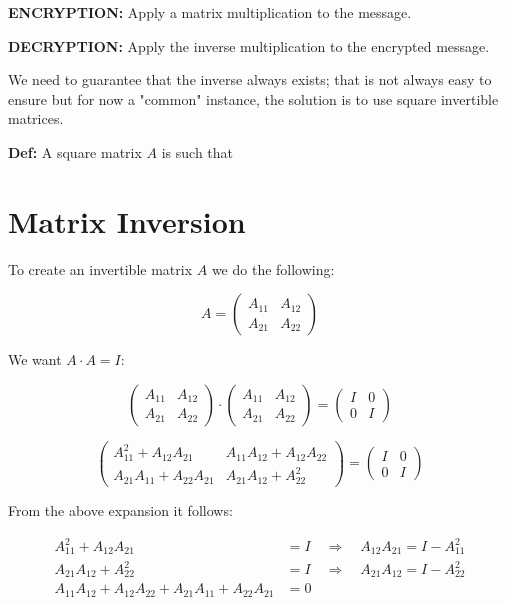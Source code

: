 \textbf{ENCRYPTION:} Apply a matrix multiplication to the message.

\textbf{DECRYPTION:} Apply the inverse multiplication to the encrypted message.

We need to guarantee that the inverse always exists; that is not always easy to ensure but for now a "common" instance, the solution is to use square invertible matrices.

\textbf{Def:} A square matrix $A$ is such that

\section{Matrix Inversion}

To create an invertible matrix \( A \) we do the following:

\[
A = \begin{pmatrix}
A_{11} & A_{12} \\
A_{21} & A_{22}
\end{pmatrix}
\]

We want \( A \cdot A = I \):

\[
\begin{pmatrix}
A_{11} & A_{12} \\
A_{21} & A_{22}
\end{pmatrix}
\cdot
\begin{pmatrix}
A_{11} & A_{12} \\
A_{21} & A_{22}
\end{pmatrix}
=
\begin{pmatrix}
I & 0 \\
0 & I
\end{pmatrix}
\]

\[
\begin{pmatrix}
A_{11}^2 + A_{12} A_{21} & A_{11} A_{12} + A_{12} A_{22} \\
A_{21} A_{11} + A_{22} A_{21} & A_{21} A_{12} + A_{22}^2
\end{pmatrix}
=
\begin{pmatrix}
I & 0 \\
0 & I
\end{pmatrix}
\]

From the above expansion it follows:

\begin{align*}
A_{11}^2 + A_{12} A_{21} &= I \quad \Rightarrow \quad A_{12} A_{21} = I - A_{11}^2 \\
A_{21} A_{12} + A_{22}^2 &= I \quad \Rightarrow \quad A_{21} A_{12} = I - A_{22}^2 \\
A_{11} A_{12} + A_{12} A_{22} + A_{21} A_{11} + A_{22} A_{21} &= 0
\end{align*}

